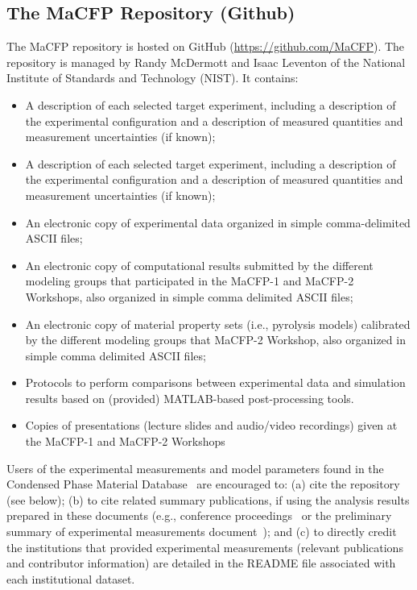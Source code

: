 \documentclass[12pt]{article}
\begin{document}
\subsection{The MaCFP Repository (Github)}
The MaCFP repository is hosted on GitHub (\url{https://github.com/MaCFP}). The repository is managed by Randy McDermott and Isaac Leventon of the National Institute of Standards and Technology (NIST). It contains: 
\begin{itemize}[noitemsep]
 \item A description of each selected target experiment, including a description of the experimental configuration and a description of measured quantities and measurement uncertainties (if known); 
  \item A description of each selected target experiment, including a description of the experimental configuration and a description of measured quantities and measurement uncertainties (if known);  
 \item An electronic copy of experimental data organized in simple comma-delimited ASCII files; 
 \item An electronic copy of computational results submitted by the different modeling groups that participated in the MaCFP-1 and MaCFP-2 Workshops, also organized in simple comma delimited ASCII files; 
  \item An electronic copy of material property sets (i.e., pyrolysis models) calibrated by the different modeling groups that MaCFP-2 Workshop, also organized in simple comma delimited ASCII files; 
 \item Protocols to perform comparisons between experimental data and simulation results based on (provided) MATLAB-based post-processing tools. 
 \item Copies of presentations (lecture slides and audio/video recordings) given at the MaCFP-1 and MaCFP-2 Workshops
\end{itemize}

Users of the experimental measurements and model parameters found in the Condensed Phase Material Database~\cite{MaCFP-cond-db} are encouraged to: (a) cite the repository (see below); (b) to cite related summary publications, if using the analysis results prepared in these documents (e.g., conference proceedings~\cite{brown2018proceedings} or the preliminary summary of experimental measurements document~\cite{MaCFP-2_Prelim_Exp}); and (c) to directly credit the institutions that provided experimental measurements (relevant publications and contributor information) are detailed in the README file associated with each institutional dataset. 
\end{document}

